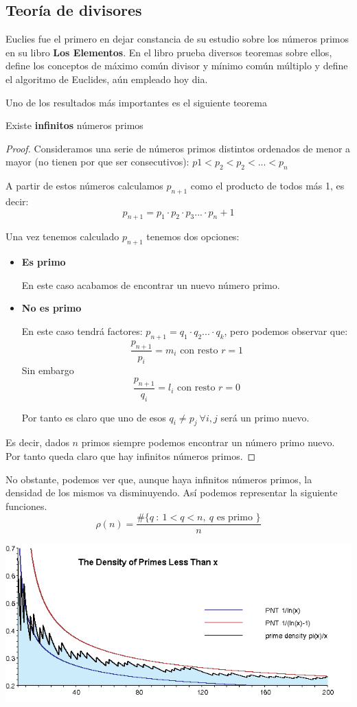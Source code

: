 \documentclass{apuntes}
\begin{document}
\subsection{Teoría de divisores}
Euclies fue el primero en dejar constancia de su estudio sobre los números primos en su libro \textbf{Los Elementos}. En el libro prueba diversos teoremas sobre ellos, define los conceptos de máximo común divisor y mínimo común múltiplo y define el algoritmo de Euclides, aún empleado hoy dia.

Uno de los resultados más importantes es el siguiente teorema
\begin{theorem}
Existe \textbf{infinitos} números primos
\end{theorem}
\begin{proof}
Consideramos una serie de números primos distintos ordenados de menor a mayor (no tienen por que ser consecutivos): $p1<p_2<p_2<...<p_n$

A partir de estos números calculamos $p_{n+1}$ como el producto de todos más 1, es decir:
\[p_{n+1}=p_1\cdot p_2 \cdot p_3 ... \cdot p_n+1\]

Una vez tenemos calculado $p_{n+1}$ tenemos dos opciones:
\begin{itemize}
\item \textbf{Es primo}

En este caso acabamos de encontrar un nuevo número primo.

\item \textbf{No es primo}

En este caso tendrá factores: $p_{n+1}=q_1\cdot q_2 ... \cdot q_k$, pero podemos observar que:
\[\frac{p_{n+1}}{p_i}=m_i \text{ con resto } r= 1\]
Sin embargo
\[\frac{p_{n+1}}{q_i}=l_i \text{ con resto } r= 0\]

Por tanto es claro que uno de esos $q_i \neq p_j \ \forall i,j$ será un primo nuevo.

\end{itemize}

Es decir, dados $n$ primos siempre podemos encontrar un número primo nuevo. Por tanto queda claro que hay infinitos números primos.

\end{proof}

No obstante, podemos ver que, aunque haya infinitos números primos, la densidad de los mismos va disminuyendo. Así podemos representar la siguiente funciones.
\[ρ(n)=\frac{\#\{q \ : \ 1 < q < n, \ q \text{ es primo }\}}{n}\]
\begin{center}
\includegraphics[width=0.8\linewidth]{img/density.png}
\end{center}
\end{document}
